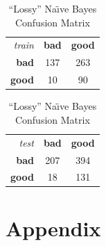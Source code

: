 \documentclass[a4paper, twocolumn]{article}
\begin{document}
        \begin{table}[h]
        \begin{center}
        \begin{tabular}{r|c|c|}
            \multicolumn{1}{r}{\emph{train}}
            &\multicolumn{1}{c}{\textbf{bad}}
            &\multicolumn{1}{c}{\textbf{good}} \\
            \cline{2-3}
            \textbf{bad} & 137 & 263 \\
            \cline{2-3}
            \textbf{good} & 10 & 90 \\
            \cline{2-3}
        \end{tabular}
        \begin{tabular}{r|c|c|}
            \multicolumn{1}{r}{\emph{test}}
            &\multicolumn{1}{c}{\textbf{bad}}
            &\multicolumn{1}{c}{\textbf{good}} \\
            \cline{2-3}
            \textbf{bad} & 207 & 394 \\
            \cline{2-3}
            \textbf{good} & 18 & 131 \\
            \cline{2-3}
        \end{tabular}
        \end{center}
        \caption{``Lossy'' Na{\"\i}ve Bayes Confusion Matrix}
        \label{table:bayes10}
        \end{table}

    \nocite{*}
    
    

    \onecolumn \appendix
    \section*{Appendix}

    
    
\end{document}
